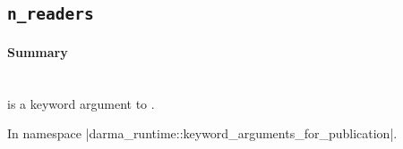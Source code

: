 \subsection{\texttt{n\_readers}}


\paragraph{Summary}\mbox{}\\ 
 is a \gls{keyword argument} to .  %

In namespace |darma_runtime::keyword_arguments_for_publication|.

%
%
%
%
%
%




